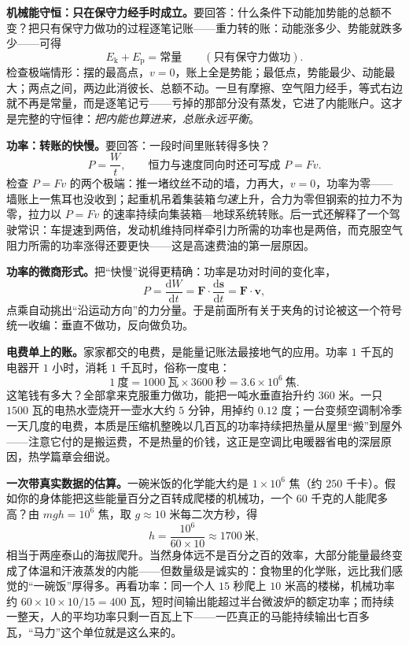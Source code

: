 \textbf{机械能守恒：只在保守力经手时成立。}要回答：什么条件下动能加势能的总额不变？把只有保守力做功的过程逐笔记账——重力转的账：动能涨多少、势能就跌多少——可得
\[
E_{\mathrm k}+E_{\mathrm p}=\text{常量}\qquad(\text{只有保守力做功}) .
\]
检查极端情形：摆的最高点，\(v=0\)，账上全是势能；最低点，势能最少、动能最大；两点之间，两边此消彼长、总额不动。一旦有摩擦、空气阻力经手，等式右边就不再是常量，而是逐笔记亏——亏掉的那部分没有蒸发，它进了内能账户。这才是完整的守恒律：\emph{把内能也算进来，总账永远平衡}。

\textbf{功率：转账的快慢。}要回答：一段时间里账转得多快？
\[
P=\frac{W}{t},\qquad\text{恒力与速度同向时还可写成 }P=Fv .
\]
检查 \(P=Fv\) 的两个极端：推一堵纹丝不动的墙，力再大，\(v=0\)，功率为零——墙账上一焦耳也没收到；起重机吊着集装箱\emph{匀速}上升，合力为零但钢索的拉力不为零，拉力以 \(P=Fv\) 的速率持续向集装箱—地球系统转账。后一式还解释了一个驾驶常识：车提速到两倍，发动机维持同样牵引力所需的功率也是两倍，而克服空气阻力所需的功率涨得还要更快——这是高速费油的第一层原因。

\begin{mathbridge}
\textbf{功率的微商形式。}把“快慢”说得更精确：功率是功对时间的变化率，
\[
P=\frac{\mathrm dW}{\mathrm dt}=\mathbf F\cdot\frac{\mathrm d\mathbf s}{\mathrm dt}=\mathbf F\cdot\mathbf v ,
\]
点乘自动挑出“沿运动方向”的力分量。于是前面所有关于夹角的讨论被这一个符号统一收编：垂直不做功，反向做负功。
\end{mathbridge}

\textbf{电费单上的账。}家家都交的电费，是能量记账法最接地气的应用。功率 \(1\) 千瓦的电器开 \(1\) 小时，消耗 \(1\) 千瓦时，俗称一度电：
\[
1\ \text{度}=1000\ \text{瓦}\times3600\ \text{秒}=3.6\times10^{6}\ \text{焦} .
\]
这笔钱有多大？全部拿来克服重力做功，能把一吨水垂直抬升约 \(360\) 米。一只 \(1500\) 瓦的电热水壶烧开一壶水大约 \(5\) 分钟，用掉约 \(0.12\) 度；一台变频空调制冷季一天几度的电费，本质是压缩机整晚以几百瓦的功率持续把热量从屋里“搬”到屋外——注意它付的是搬运费，不是热量的价钱，这正是空调比电暖器省电的深层原因，热学篇章会细说。

\textbf{一次带真实数据的估算。}一碗米饭的化学能大约是 \(1\times10^{6}\) 焦（约 \(250\) 千卡）。假如你的身体能把这些能量百分之百转成爬楼的机械功，一个 \(60\) 千克的人能爬多高？由 \(mgh=10^{6}\) 焦，取 \(g\approx10\) 米每二次方秒，得
\[
h=\frac{10^{6}}{60\times10}\approx 1700\ \text{米} ,
\]
相当于两座泰山的海拔爬升。当然身体远不是百分之百的效率，大部分能量最终变成了体温和汗液蒸发的内能——但数量级是诚实的：食物里的化学账，远比我们感觉的“一碗饭”厚得多。再看功率：同一个人 \(15\) 秒爬上 \(10\) 米高的楼梯，机械功率约 \(60\times10\times10/15=400\) 瓦，短时间输出能超过半台微波炉的额定功率；而持续一整天，人的平均功率只剩一百瓦上下——一匹真正的马能持续输出七百多瓦，“马力”这个单位就是这么来的。

